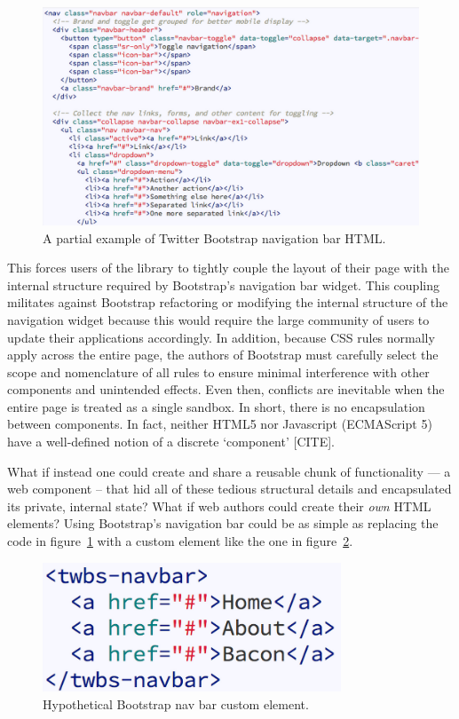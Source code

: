 % 
\begin{figure}[htb]
\centering
 \includegraphics[width=6in]{images/bootstrap_navbar_html.png}
\caption{A partial example of Twitter Bootstrap navigation bar HTML.}
\label{f:twbs1}
\end{figure}
%

This forces users of the library to tightly couple the layout of their page with the internal structure required by Bootstrap's navigation bar widget. 
This coupling militates against Bootstrap refactoring or modifying the internal structure of the navigation widget because this would require the large community of users to update their applications accordingly.
In addition, because CSS rules normally apply across the entire page, the authors of Bootstrap must carefully select the scope and nomenclature of all rules to ensure minimal interference with other components and unintended effects. 
Even then, conflicts are inevitable when the entire page is treated as a single sandbox. 
In short, there is no encapsulation between components. 
In fact, neither HTML5 nor Javascript (ECMAScript 5) have a well-defined notion of a discrete `component' [CITE].

What if instead one could create and share a reusable chunk of functionality --- a web component -- that hid all of these tedious structural details and encapsulated its private, internal state? 
What if web authors could create their \textit{own} HTML elements?  
Using Bootstrap's navigation bar could be as simple as replacing the code in figure~\ref{f:twbs1} with a custom element like the one in figure~\ref{f:twbs2}.

% 
\begin{figure}[htb]
\centering
 \includegraphics[width=3.5in]{images/bootstrap_navbar_wc.png}
\caption{Hypothetical Bootstrap nav bar custom element.}
\label{f:twbs2}
\end{figure}
%


